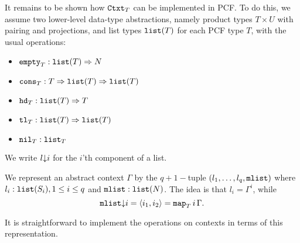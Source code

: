 \documentclass[11pt]{article}
\newcommand{\lang}{\langle}
\newcommand{\rang}{\rangle}
\begin{document}
It remains to be shown how ${\tt Ctxt}_T$ can be implemented in PCF. To do
this, we assume two lower-level data-type abstractions, namely product
types $T\times U$ with pairing and projections, and list types ${\tt list}(T)$
for each PCF type $T$, with the usual operations:
\begin{itemize}
\item ${\tt empty}_T:{\tt list}(T)\Rightarrow N$
\item ${\tt cons}_T:T\Rightarrow{\tt list}(T)\Rightarrow{\tt list}(T)$
\item ${\tt hd}_T:{\tt list}(T)\Rightarrow T$
\item ${\tt tl}_T:{\tt list}(T)\Rightarrow{\tt list}(T)$
\item ${\tt nil}_T:{\tt list}_T$
\end{itemize}

We write $l{\downarrow} i$ for the $i$'th component of a list.

We represent an abstract context $\Gamma$ by the $q+1-$tuple
$(l_1,\dots,l_q,{\tt mlist})$ where $l_i:{\tt list}(S_i), 1\leq i\leq q$ and
${\tt mlist}:{\tt list}(N)$. The idea is that $l_i=\Gamma^i$, while
\[ {\tt mlist}\converges i= \lang i_1,i_2\rang ={\tt map}_T \, i \,
\Gamma . \]

It is straightforward to implement the operations on contexts in terms of this representation.
\end{document}
